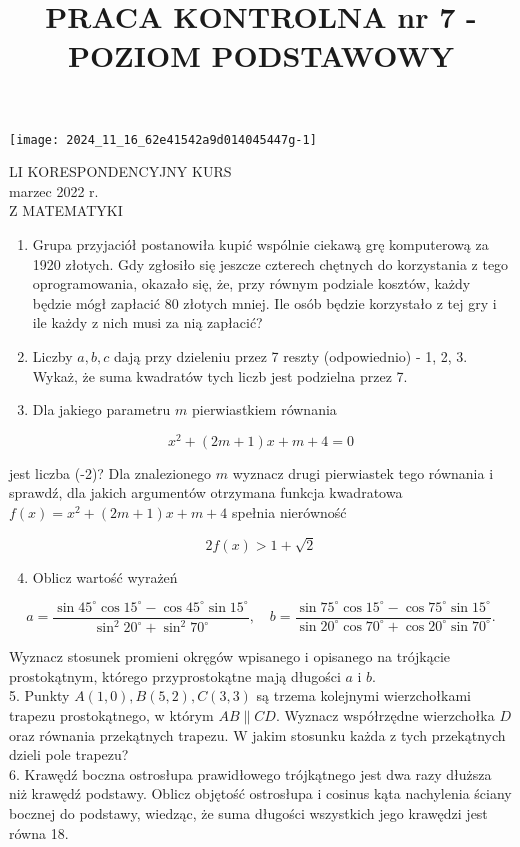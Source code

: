 \documentclass[10pt]{article}
\title{PRACA KONTROLNA nr 7 - POZIOM PODSTAWOWY }
\author{}
\date{}
\begin{document}
\maketitle
\begin{center}
\texttt{[image: 2024\_11\_16\_62e41542a9d014045447g-1]}
\end{center}

LI KORESPONDENCYJNY KURS\\
marzec 2022 r.\\
Z MATEMATYKI

\begin{enumerate}
  \item Grupa przyjaciół postanowiła kupić wspólnie ciekawą grę komputerową za 1920 złotych. Gdy zgłosiło się jeszcze czterech chętnych do korzystania z tego oprogramowania, okazało się, że, przy równym podziale kosztów, każdy będzie mógł zapłacić 80 złotych mniej. Ile osób będzie korzystało z tej gry i ile każdy z nich musi za nią zapłacić?
  \item Liczby $a, b, c$ dają przy dzieleniu przez 7 reszty (odpowiednio) - 1, 2, 3. Wykaż, że suma kwadratów tych liczb jest podzielna przez 7.
  \item Dla jakiego parametru $m$ pierwiastkiem równania
\end{enumerate}

$$
x^{2}+(2 m+1) x+m+4=0
$$

jest liczba (-2)? Dla znalezionego $m$ wyznacz drugi pierwiastek tego równania i sprawdź, dla jakich argumentów otrzymana funkcja kwadratowa $f(x)=x^{2}+(2 m+1) x+m+4$ spełnia nierówność

$$
2 f(x)>1+\sqrt{2}
$$

\begin{enumerate}
  \setcounter{enumi}{3}
  \item Oblicz wartość wyrażeń
\end{enumerate}

$$
a=\frac{\sin 45^{\circ} \cos 15^{\circ}-\cos 45^{\circ} \sin 15^{\circ}}{\sin ^{2} 20^{\circ}+\sin ^{2} 70^{\circ}}, \quad b=\frac{\sin 75^{\circ} \cos 15^{\circ}-\cos 75^{\circ} \sin 15^{\circ}}{\sin 20^{\circ} \cos 70^{\circ}+\cos 20^{\circ} \sin 70^{\circ}} .
$$

Wyznacz stosunek promieni okręgów wpisanego i opisanego na trójkącie prostokątnym, którego przyprostokątne mają długości $a$ i $b$.\\
5. Punkty $A(1,0), B(5,2), C(3,3)$ są trzema kolejnymi wierzchołkami trapezu prostokątnego, w którym $A B \| C D$. Wyznacz współrzędne wierzchołka $D$ oraz równania przekątnych trapezu. W jakim stosunku każda z tych przekątnych dzieli pole trapezu?\\
6. Krawędź boczna ostrosłupa prawidłowego trójkątnego jest dwa razy dłuższa niż krawędź podstawy. Oblicz objętość ostrosłupa i cosinus kąta nachylenia ściany bocznej do podstawy, wiedząc, że suma długości wszystkich jego krawędzi jest równa 18.
\end{document}
